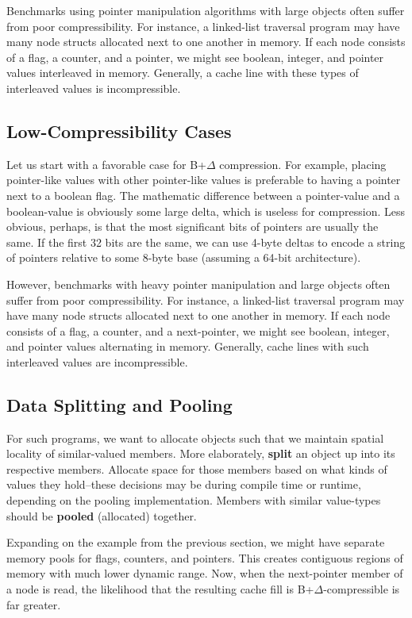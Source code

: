 \documentclass[pageno]{jpaper}
\begin{document}
Benchmarks using pointer manipulation algorithms with large objects often suffer from poor compressibility. For instance, a linked-list traversal program may have many node structs allocated next to one another in memory. If each node consists of a flag, a counter, and a pointer, we might see boolean, integer, and pointer values interleaved in memory. Generally, a cache line with these types of interleaved values is incompressible.


\subsection{Low-Compressibility Cases}

Let us start with a favorable case for B+$\Delta$ compression. For example, placing pointer-like values with other pointer-like values is preferable to having a pointer next to a boolean flag. The mathematic difference between a pointer-value and a boolean-value is obviously some large delta, which is useless for compression.  Less obvious, perhaps, is that the most significant bits of pointers are usually the same. If the first 32 bits are the same, we can use 4-byte deltas to encode a string of pointers relative to some 8-byte base (assuming a 64-bit architecture).

However, benchmarks with heavy pointer manipulation and large objects often suffer from poor compressibility. For instance, a linked-list traversal program may have many node structs allocated next to one another in memory. If each node consists of a flag, a counter, and a next-pointer, we might see boolean, integer, and pointer values alternating in memory. Generally, cache lines with such interleaved values are incompressible.


\subsection{Data Splitting and Pooling}
 For such programs, we want to allocate objects such that we maintain spatial locality of similar-valued members. More elaborately, \textbf{split} an object up into its respective members. Allocate space for those members based on what kinds of values they hold--these decisions may be during compile time or runtime, depending on the pooling implementation. Members with similar value-types should be \textbf{pooled} (allocated) together.

Expanding on the example from the previous section, we might have separate memory pools for flags, counters, and pointers. This creates contiguous regions of memory with much lower dynamic range. Now, when the next-pointer member of a node is read, the likelihood that the resulting cache fill is B+$\Delta$-compressible is far greater.
\end{document}
